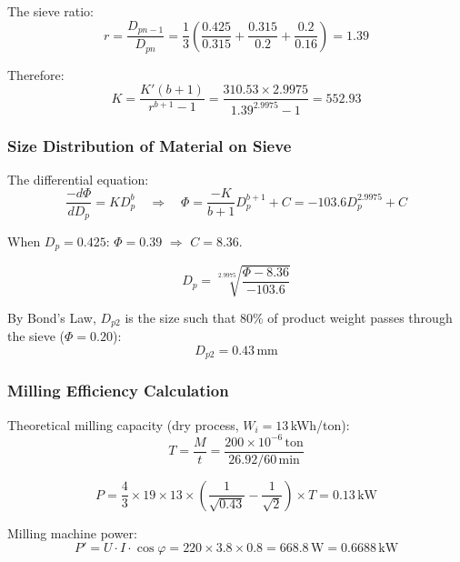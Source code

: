 The sieve ratio:
\begin{equation*}
    r = \frac{D_{pn-1}}{D_{pn}} = \frac{1}{3}\left(\frac{0.425}{0.315} + \frac{0.315}{0.2} + \frac{0.2}{0.16}\right) = 1.39
\end{equation*}

Therefore:
\begin{equation*}
    K = \frac{K'(b+1)}{r^{b+1} - 1} = \frac{310.53 \times 2.9975}{1.39^{2.9975} - 1} = 552.93
\end{equation*}

\subsubsection{Size Distribution of Material on Sieve}

The differential equation:
\begin{equation*}
    \frac{-d\varPhi}{dD_p} = K D_p^b
    \quad \Rightarrow \quad
    \varPhi = \frac{-K}{b+1} D_p^{b+1} + C = -103.6 D_p^{2.9975} + C
\end{equation*}

When $D_p = 0.425$: $\varPhi = 0.39$ $\Rightarrow$ $C = 8.36$.

\begin{equation*}
    D_p = \sqrt[2.9975]{\frac{\varPhi - 8.36}{-103.6}}
\end{equation*}

By Bond's Law, $D_{p2}$ is the size such that 80\% of product weight passes through the sieve ($\varPhi = 0.20$):
\begin{equation*}
    D_{p2} = 0.43\,\text{mm}
\end{equation*}

\subsubsection{Milling Efficiency Calculation}

Theoretical milling capacity (dry process, $W_i = 13$\,kWh/ton):
\begin{equation*}
    T = \frac{M}{t} = \frac{200 \times 10^{-6}\,\text{ton}}{26.92/60\,\text{min}}
\end{equation*}

\begin{equation*}
    P = \frac{4}{3} \times 19 \times 13 \times \left(\frac{1}{\sqrt{0.43}} - \frac{1}{\sqrt{2}}\right) \times T = 0.13\,\text{kW}
\end{equation*}

Milling machine power:
\begin{equation*}
    P' = U \cdot I \cdot \cos\varphi = 220 \times 3.8 \times 0.8 = 668.8\,\text{W} = 0.6688\,\text{kW}
\end{equation*}

